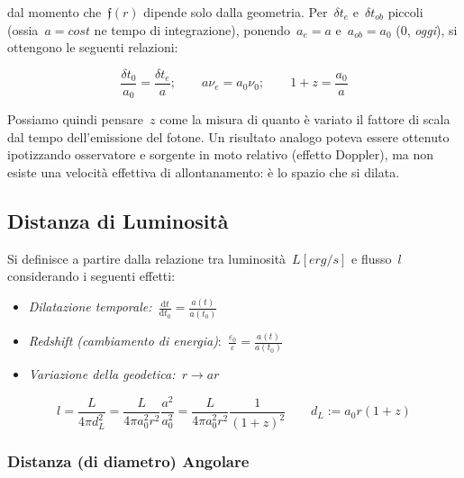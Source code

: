 dal momento che~\(\mathfrak{f}(r)\) dipende solo dalla geometria.
Per~\(\delta t_{e}\) e~\(\delta t_{ob}\) piccoli
(ossia~\(a=cost\) ne tempo di integrazione),
ponendo~\(a_e=a\) e~\(a_{ob}=a_0\) (0, \emph{oggi}), si
ottengono le seguenti relazioni:

\begin{equation}
\frac{\delta t_0}{a_0}=\frac{\delta t_e}{a};\qquad a\nu_e=a_0\nu_0;\qquad 1+z=\frac{a_0}{a}
\end{equation}

Possiamo quindi pensare~\(z\) come la misura di quanto è
variato il fattore di scala dal tempo dell'emissione del fotone. Un
risultato analogo poteva essere ottenuto ipotizzando osservatore e
sorgente in moto relativo (effetto Doppler), ma non esiste una velocità
effettiva di allontanamento: è lo spazio che si dilata.


\subsection{Distanza di Luminosità}

Si definisce a partire dalla relazione tra luminosità~\(L [erg/s]\)
e flusso~\(l\) considerando i seguenti effetti:

\begin{itemize}
\item
  \emph{Dilatazione temporale:~\(\frac{\mathrm{d}t}{\mathrm{d}t_0}=\frac{a(t)}{a(t_0)}\)}
\item
  \emph{Redshift (cambiamento di energia)}:~\(\frac{\varepsilon_0}{\varepsilon}=\frac{a(t)}{a(t_0)}\)
\end{itemize}

\begin{itemize}
\item
  \emph{Variazione della geodetica:~\(r\rightarrow ar\)}
\end{itemize}

\par\null

\begin{equation}
l=\frac{L}{4\pi d_L^2}=\frac{L}{4\pi a_0^2r^2}\frac{a^2}{a_0^2}=\frac{L}{4\pi a_0^2r^2}\frac{1}{(1+z)^2}\qquad d_L := a_0 r (1+z)
\end{equation}

\subsubsection*{Distanza (di diametro)
Angolare}

